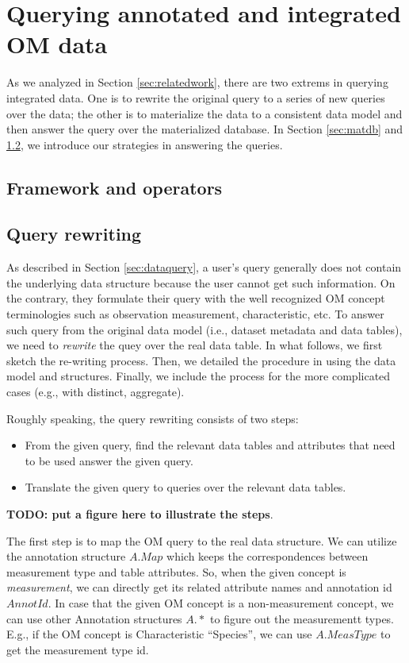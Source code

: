 \documentclass[conference]{IEEEtran}
\begin{document}
\section{Querying annotated and integrated OM data}

As we analyzed in Section \ref{sec:relatedwork}, there are two extrems
in querying integrated data. 
One is to rewrite the original query to a series of new queries over
the data; the other is to materialize the data to a consistent data
model and then answer the query over the materialized database. 
In Section \ref{sec:matdb} and \ref{sec:queryrewrite}, we introduce
our strategies in answering the queries. 

\subsection{Framework and operators}

\subsection{Query rewriting}\label{sec:queryrewrite}

As described in Section \ref{sec:dataquery}, 
a user's query generally does not contain the underlying data
structure because the user cannot get such information. 
On the contrary, they formulate their query with the well recognized
OM concept terminologies such as observation
measurement, characteristic, etc. 
To answer such query from the original data model (i.e., dataset
metadata and data tables), we need to {\em rewrite} the quey over the
real data table. 
In what follows, we first sketch the re-writing process. Then, we
detailed the procedure in using the data model and
structures. Finally, we include the process for the more complicated
cases (e.g., with distinct, aggregate). 

Roughly speaking, the query rewriting consists of two steps:
\begin{itemize}
\item From the given query, find the relevant data tables and
  attributes that need to be used answer the given query. 
\item Translate the given query to queries over the relevant data
  tables. 
\end{itemize}

{\bf TODO: put a figure here to illustrate the steps}. 

The first step is to map the OM query to the real data structure. 
We can utilize the annotation structure $A.Map$ which keeps the correspondences between
measurement type and table attributes. 
So, when the given concept is {\em measurement}, we can directly get
its related attribute names and annotation id $AnnotId$. 
In case that the given OM concept is a non-measurement concept, we can use
other Annotation structures $A.*$ to figure out the measurementt types. 
E.g., if the OM concept is Characteristic ``Species'', we can use
$A.MeasType$ to get the measurement type id. 
\end{document}
